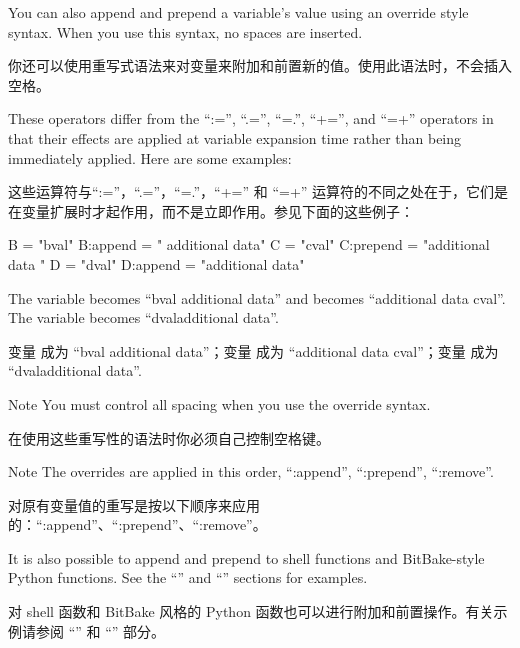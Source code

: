 
You can also append and prepend a variable's value using an override style syntax. When you use this syntax, no spaces are inserted.

你还可以使用重写式语法来对变量来附加和前置新的值。使用此语法时，不会插入空格。

These operators differ from the ``:='', ``.='', ``=.'', ``+='', and ``=+'' operators in that their effects are applied at variable expansion time rather than being immediately applied. Here are some examples:

这些运算符与``:=''，``.=''，``=.''，``+='' 和 ``=+'' 运算符的不同之处在于，它们是在变量扩展时才起作用，而不是立即作用。参见下面的这些例子：

\begin{pyglist}
B = "bval"
B:append = " additional data"
C = "cval"
C:prepend = "additional data "
D = "dval"
D:append = "additional data"
\end{pyglist}

The variable  becomes ``bval additional data'' and  becomes ``additional data cval''. The variable  becomes ``dvaladditional data''.

变量  成为 ``bval additional data''；变量  成为 ``additional data cval''；变量  成为 ``dvaladditional data''.

\begin{noteblock}{Note}%
You must control all spacing when you use the override syntax.

\medskip
在使用这些重写性的语法时你必须自己控制空格键。
\end{noteblock}

\begin{noteblock}{Note}%
The overrides are applied in this order, ``:append'', ``:prepend'', ``:remove''.

\medskip
对原有变量值的重写是按以下顺序来应用的：``:append''、``:prepend''、``:remove''。
\end{noteblock}

It is also possible to append and prepend to shell functions and BitBake-style Python functions. See the ``'' and ``'' sections for examples.

对 shell 函数和 BitBake 风格的 Python 函数也可以进行附加和前置操作。有关示例请参阅 ``'' 和 ``'' 部分。


